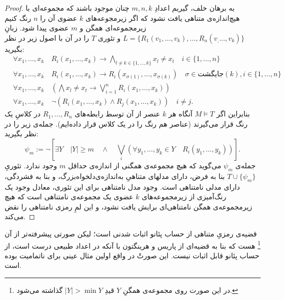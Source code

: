 \documentclass[12pt,a4paper]{report}
\theoremstyle{colorhead}
\begin{document}
\begin{proof}
به برهان خلف، گیریم اعدادِ
$m,n,k$
چنان موجود باشند که مجموعه‌ای با هیچ‌اندازه‌ی متناهی یافت نشود که اگر زیرمجوعه‌های
$k$
عضوی آن را 
$n$
رنگ کنیم زیرمجموعه‌ای
همگن و 
$m$
عضوی پیدا شود. زبانِ
$L=\{R_1(v_1,\ldots,v_k),\ldots,R_n(v_,\ldots,v_k)\}$
و تئوری
$T$
را در آن با اصول زیر در نظر بگیرید:
\begin{align*}
&\forall x_1,\ldots,x_k\quad  R_i(x_1,\ldots,x_k)\to \bigwedge_{l\not=k\in \{1,\ldots,k\}} x_l\not=x_t\quad i\in \{1,\ldots,n\}
\\
&
\forall x_1,\ldots,x_k\quad  
R_i(x_1,\ldots,x_k)\to R_i(x_{\sigma(1)},\ldots,x_{\sigma(k)})\quad \sigma\in \textbf{جایگشت}(k),
i\in \{1,\ldots,n\}
\\
&
\forall x_1,\ldots,x_k \quad \left(\bigwedge x_l\not=x_t\to \bigvee_{i=1}^n R_i(x_1,\ldots,x_k)\right)\\
&
\forall x_1,\ldots,x_k  \quad \neg \left(R_i(x_1,\ldots,x_k)\wedge R_j(x_1,\ldots,x_k)\right)\quad  i\neq j.
\end{align*}
بنابراین اگر
$M\models T$
آنگاه هر 
$k$
عنصر از آن  توسط رابطه‌های
$R_1,\ldots,R_n$
در کلاسِ یک رنگ قرار می‌گیرند (عناصر هم رنگ را در یک کلاس قرار داده‌ایم).  جمله‌‌ی زیر را در نظر بگیرید:
\[
\psi_m:= \neg \left[\exists Y\quad |Y|\geq m\quad \wedge \quad 
\bigvee_i
\left(\forall y_1,\ldots,y_k\in Y \quad R_i(y_1,\ldots,y_k)\right)\right]. 
\]
جمله‌ی
$\psi_m$
می‌گوید که هیچ مجموعه‌ی همگنی از اندازه‌ی حداقل
$m$
وجود ندارد. 
تئوریِ
$T\cup \{\psi_m\}$
بنا به فرض،
دارای مدلهای متناهیِ
به‌اندازه‌ی‌دلخواه‌بزرگ، و بنا به فشردگی، دارای 
مدلی نامتناهی است.
وجود مدل نامتناهی برای این تئوری،
معادل وجود یک رنگ‌آمیزی از زیرمجموعه‌های
$k$
عضوی یک مجموعه‌ی نامتناهی است که هیچ زیرمجموعه‌ی همگن نامتناهی‌ای برایش یافت نشود،‌ و این لمِ رمزی نامتناهی را نقض می‌کند.
\end{proof}
قضیه‌ی رمزیِ متناهی از حساب پئانو اثبات شدنی است؛ 
لیکن 
صورتی پیشرفته‌تر از آن
\footnote{در این صورت روی مجموعه‌ی همگنِ
$Y$
قیدِ
$|Y|>\min Y$
گذاشته می‌شود.
}
 هست که
بنا به قضیه‌ای از
پاریس و هرینگتون
با آنکه در
اعداد طبیعی درست است،‌
از حساب
پئانو قابل اثبات نیست. این صورتْ در واقع اولین مثال عینی برای ناتمامیت بوده است. 
\newpage 
\end{document}
